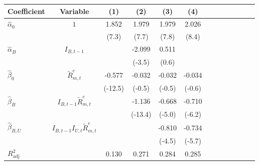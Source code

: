 \begin{tabular}{lcccccccccccc}
\toprule
Coefficient & Variable & (1) & (2) & (3) & (4) \\
\midrule
$\hat\alpha_0$ & $1$ & 1.852 & 1.979 & 1.979 & 2.026 \\
 &  & (7.3) & (7.7) & (7.8) & (8.4) \\
$\hat\alpha_B$ & $I_{B,t-1}$ &  & -2.099 & 0.511 &  \\
 &  &  & (-3.5) & (0.6) &  \\
$\hat\beta_0$ & $\tilde{R}^e_{m,t}$ & -0.577 & -0.032 & -0.032 & -0.034 \\
 &  & (-12.5) & (-0.5) & (-0.5) & (-0.6) \\
$\hat\beta_{B}$ & $I_{B,t-1}\tilde{R}^e_{m,t}$ &  & -1.136 & -0.668 & -0.710 \\
 &  &  & (-13.4) & (-5.0) & (-6.2) \\
$\hat\beta_{B,U}$ & $I_{B,t-1}I_{U,t}\tilde{R}^e_{m,t}$ &  &  & -0.810 & -0.734 \\
 &  &  &  & (-4.5) & (-5.7) \\
$R^2_{\text{adj}}$ &  & 0.130 & 0.271 & 0.284 & 0.285 \\
\bottomrule
\end{tabular}
